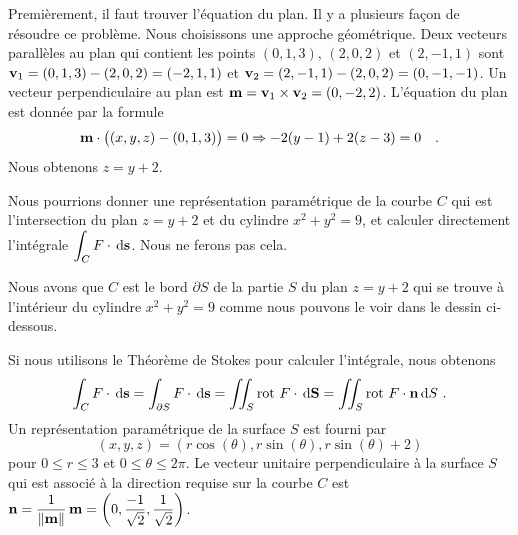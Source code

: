 {\begin{egg}
Premièrement, il faut trouver l'équation du plan.  Il y a plusieurs
façon de résoudre ce problème.  Nous choisissons une approche géométrique.
Deux vecteurs parallèles au plan qui contient les points
$(0,1,3)$, $(2,0,2)$ et $(2,-1,1)$ sont
$\mathbf{v}_1 = (0,1,3) - (2,0,2) = (-2,1,1)$ et
$\mathbf{v}_2 = (2,-1,1) - (2,0,2) = (0,-1,-1)$.  Un vecteur
perpendiculaire au plan est
$\mathbf{m} = \mathbf{v}_1 \times \mathbf{v}_2 = (0,-2,2)$.  L'équation du plan
est donnée par la formule
\[
  \mathbf{m} \cdot \big( (x,y,z) - (0,1,3) \big) = 0 \Rightarrow
  -2 (y-1) +2 (z-3) = 0 \quad .
\]
Nous obtenons $z = y + 2$.

Nous pourrions donner une représentation paramétrique de la courbe $C$
qui est l'intersection du plan $z = y+2$ et du cylindre
$x^2 + y^2 = 9$, et calculer directement l'intégrale
$\displaystyle \int_C F \cdot \,\mathrm{d}\mathbf{s}$.  Nous ne ferons pas cela.

Nous avons que $C$ est le bord $\partial S$ de la partie $S$ du plan $z = y+2$
qui se trouve à l'intérieur du cylindre $x^2 + y^2 = 9$ comme nous pouvons
le voir dans le dessin ci-dessous.

Si nous utilisons le Théorème de Stokes pour calculer l'intégrale,
nous obtenons
\[
\int_C F \cdot \,\mathrm{d}\mathbf{s} = \int_{\partial S} F\cdot \,\mathrm{d}\mathbf{s}
= \iint_S \operatorname{rot}\,F \cdot \,\mathrm{d}\mathbf{S}
= \iint_S \operatorname{rot}\,F \cdot \mathbf{n} \,\mathrm{d}S \ .
\]
Un représentation paramétrique de la surface $S$ est fourni par
\[
  (x,y,z) = (r \cos(\theta), r\sin(\theta), r\sin(\theta) + 2)
\]
pour $0\leq r \leq 3$ et $0 \leq \theta \leq 2\pi$.  Le vecteur
unitaire perpendiculaire à la surface $S$ qui est associé à la
direction requise sur la courbe $C$ est
$\displaystyle \mathbf{n} = \frac{1}{\|\mathbf{m}\|}\,\mathbf{m} =
\left( 0, \frac{-1}{\sqrt{2}}, \frac{1}{\sqrt{2}} \right)$.


\end{egg}}
